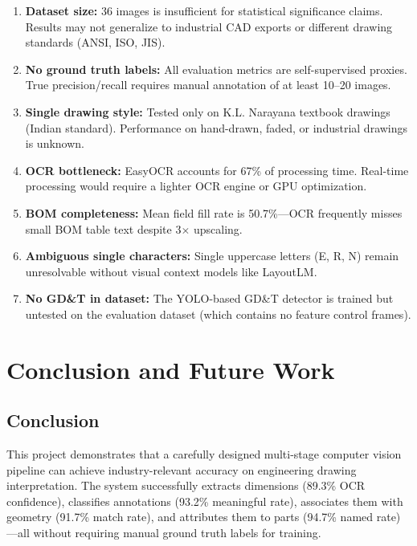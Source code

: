 \documentclass[12pt,a4paper]{article}
\begin{document}
\begin{enumerate}
    \item \textbf{Dataset size:} 36 images is insufficient for statistical significance claims. Results may not generalize to industrial CAD exports or different drawing standards (ANSI, ISO, JIS).
    
    \item \textbf{No ground truth labels:} All evaluation metrics are self-supervised proxies. True precision/recall requires manual annotation of at least 10--20 images.
    
    \item \textbf{Single drawing style:} Tested only on K.L. Narayana textbook drawings (Indian standard). Performance on hand-drawn, faded, or industrial drawings is unknown.
    
    \item \textbf{OCR bottleneck:} EasyOCR accounts for 67\% of processing time. Real-time processing would require a lighter OCR engine or GPU optimization.
    
    \item \textbf{BOM completeness:} Mean field fill rate is 50.7\%---OCR frequently misses small BOM table text despite 3$\times$ upscaling.
    
    \item \textbf{Ambiguous single characters:} Single uppercase letters (E, R, N) remain unresolvable without visual context models like LayoutLM.
    
    \item \textbf{No GD\&T in dataset:} The YOLO-based GD\&T detector is trained but untested on the evaluation dataset (which contains no feature control frames).
\end{enumerate}

\section{Conclusion and Future Work}

\subsection{Conclusion}

This project demonstrates that a carefully designed multi-stage computer vision pipeline can achieve industry-relevant accuracy on engineering drawing interpretation. The system successfully extracts dimensions (89.3\% OCR confidence), classifies annotations (93.2\% meaningful rate), associates them with geometry (91.7\% match rate), and attributes them to parts (94.7\% named rate)---all without requiring manual ground truth labels for training.
\end{document}
